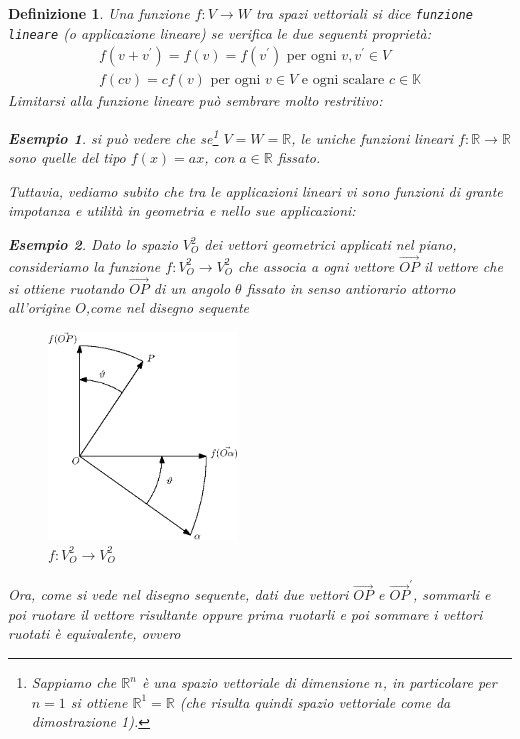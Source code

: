 \documentclass{book}
\newtheorem{definizione}{Definizione}
\newtheorem{esempio}{Esempio}
\begin{document}
\begin{definizione}
  Una funzione $f:V\to W$ tra spazi vettoriali si dice \texttt{funzione lineare} (o \textit{applicazione
    lineare}) se verifica le due seguenti proprietà:
  \begin{eqnarray}
    \label{4.1-4.2}
    f(v+v^{\prime})=f(v)=f(v^\prime) \text{ per ogni } v,v^\prime \in V\\
    f(cv)=cf(v) \text{ per ogni } v\in V\text{ e ogni scalare }c \in \mathds{K}
  \end{eqnarray}
  Limitarsi alla funzione lineare può sembrare molto restritivo:
  \begin{esempio}
    si può vedere che se\footnote{Sappiamo che $\mathds{R}^n$ è una spazio vettoriale di dimensione $n$, in
      particolare per $n=1$ si ottiene $\mathds{R}^1=\mathds{R}$ (che risulta quindi spazio vettoriale come da
      dimostrazione 1).}  $V=W=\mathds{R}$, le uniche funzioni lineari $f:\mathds{R}\to\mathds{R}$ sono quelle
    del tipo $f(x)=ax$, con $a\in \mathds{R}$ fissato.
  \end{esempio}
  Tuttavia, vediamo subito che tra le applicazioni lineari vi sono funzioni di grante impotanza e utilità in
  geometria e nello sue applicazioni:
  \begin{esempio}
    Dato lo spazio $V_O^2$ dei vettori geometrici applicati nel piano, consideriamo la funzione
    $f:V_O^2\to V_O^2$ che associa a ogni vettore $\vec{OP}$ il vettore che si ottiene ruotando $\vec{OP}$ di
    un angolo $\theta$ fissato in senso antiorario attorno all'origine $O$,come nel disegno sequente 
    \begin{figure}[th]
      \centering
        \includegraphics[width=5cm]{img/finiti/imgex4-2-1.eps}
      \caption{$f:V_O^2\to V_O^2$}
    \end{figure}
    Ora, come si vede nel disegno sequente, dati due vettori $\vec{OP}$ e $\vec{OP}^\prime$, sommarli e poi
    ruotare il vettore risultante oppure prima ruotarli e poi sommare i vettori ruotati è equivalente, ovvero

\end{esempio}
\end{definizione}
\end{document}
